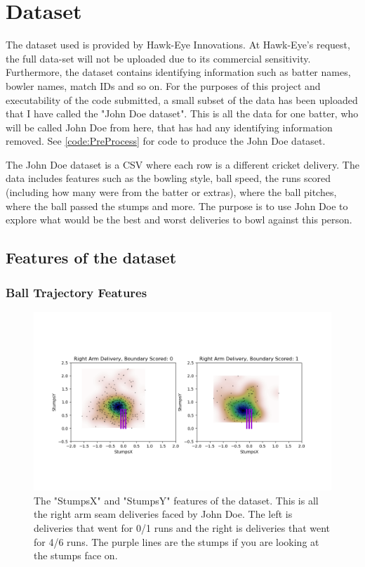 \documentclass[12pt,a4paper]{report}
\theoremstyle{definition}
\begin{document}
\section{Dataset} \label{sec:Dataset}

The dataset used is provided by Hawk-Eye Innovations.
At Hawk-Eye's request, the full data-set will not be uploaded due to its commercial sensitivity.
Furthermore, the dataset contains identifying information such as batter names, bowler names, match IDs and so on.
For the purposes of this project and executability of the code submitted, a small subset of the data has been uploaded that I have called the "John Doe dataset". 
This is all the data for one batter, who will be called John Doe from here, that has had any identifying information removed.
See \ref{code:PreProcess} for code to produce the John Doe dataset.

The John Doe dataset is a CSV where each row is a different cricket delivery. 
The data includes features such as the bowling style, ball speed, the runs scored (including how many were from the batter or extras), where the ball pitches, where the ball passed the stumps and more.     
The purpose is to use John Doe to explore what would be the best and worst deliveries to bowl against this person.

\subsection{Features of the dataset}

\subsubsection{Ball Trajectory Features}

\begin{figure}
    \centering
    \includegraphics[width=\linewidth]{post_wicket_right_arm.png}
    \caption{The "StumpsX" and "StumpsY" features of the dataset. This is all the right arm seam deliveries faced by John Doe. The left is deliveries that went for 0/1 runs and the right is deliveries that went for 4/6 runs. The purple lines are the stumps if you are looking at the stumps face on.}
    \label{fig:StumpsXYRight}
\end{figure}
\end{document}
